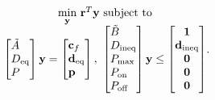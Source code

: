 \begin{equation}\label{eqn:finalObjective}
	\begin{matrix*}[c]
		\underset{\mathbf{y}}{\scalebox{1}{\text{min}}} \ \mathbf{r}^T\mathbf{y} \ \text{subject to}\\
		\begin{bmatrix*}[l]
				\tilde{A} \\
				D_{\text{eq}} \\
				P
				\end{bmatrix*} \mathbf{y} = \begin{bmatrix*}[l]\mathbf{c}_f \\ \mathbf{d}_{\text{eq}}\\\mathbf{p} \end{bmatrix*}, \ \begin{bmatrix*}[l]
			\tilde{B} \\
			D_{\text{ineq}} \\ 
			P_{\text{max}} \\
			P_{\text{on}} \\
			P_{\text{off}}
			\end{bmatrix*}\mathbf{y} \le \begin{bmatrix*}\mathbf{1} \\ \mathbf{d}_{\text{ineq}} \\ \mathbf{0} \\ \mathbf{0} \\ \mathbf{0} \end{bmatrix*}
	\end{matrix*}.
\end{equation}


